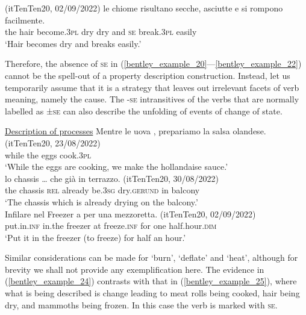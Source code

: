 \documentclass[output=paper,colorlinks,citecolor=brown
]{langscibook}
\begin{document}
\hspace*{\fill}(itTenTen20, 02/09/2022)\quad
\ea \label{bentley_example_23}
    \gll  {\ldots}  le		chiome risultano				secche,	asciutte e				si 		rompono facilmente.\\
    {} the	hair				become.3\textsc{pl}	dry					dry					and	\textsc{se}		break.3\textsc{pl}	easily \\
    \glt ‘Hair becomes dry and breaks easily.’ 
\z

Therefore, the absence of \textsc{se} in (\ref{bentley_example_20}—\ref{bentley_example_22}) cannot be the spell-out of a property description construction. Instead, let us temporarily assume that it is a strategy that leaves out irrelevant facets of verb meaning, namely the cause. 
The -\textsc{se} intransitives of the verbs that are normally labelled as ±\textsc{se} can also describe the unfolding of events of change of state. 

\ea \label{bentley_example_24}
    \underline{Description of processes} 
    \ea \label{bentley_example_24a}
    \gll Mentre	le			uova	, { prepariamo la salsa olandese. (itTenTen20, 23/08/2022)} \\
    while			the		eggs		cook.3\textsc{pl} {} \\
    \glt ‘While the eggs are cooking, we make the hollandaise sauce.’ \\
    \ex \label{bentley_example_24b}
    \gll  {\ldots}  lo chassis  {\ldots}  che		già 				 				in 	terrazzo. {(itTenTen20, 30/08/2022)}\\
    {} the	chassis	 {}				\textsc{rel}	already	be.3\textsc{sg}	dry.\textsc{gerund}	in		balcony	{} \\
    \glt 	‘The chassis which is already drying on the balcony.’ \\
    \ex \label{bentley_example_24c}
    \gll Infilare			nel			Freezer	a				per 	una	mezzoretta. {(itTenTen20, 02/09/2022)}\\
    put.in.\textsc{inf}		in.the	freezer		at	freeze.\textsc{inf}	for		one	half.hour.\textsc{dim}	{} \\
    \glt 					‘Put it in the freezer (to freeze) for half an hour.’ \\
    \z
\z

Similar considerations can be made for  ‘burn’,  ‘deflate’ and  ‘heat’, although for brevity we shall not provide any exemplification here. 
The evidence in (\ref{bentley_example_24}) contrasts with that in (\ref{bentley_example_25}), where what is being described is change leading to meat rolls being cooked, hair being dry, and mammoths being frozen. In this case the verb is marked with \textsc{se}.
\end{document}
